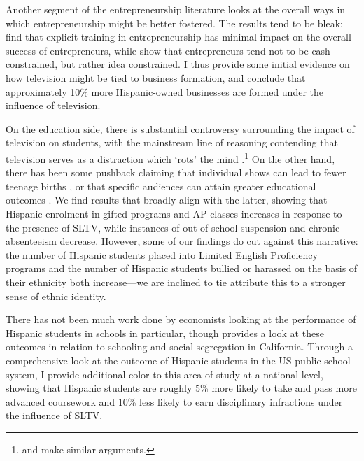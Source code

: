 \documentclass[11pt]{article}
\begin{document}
Another segment of the entrepreneurship literature looks at the overall ways in which entrepreneurship might be better fostered. The results tend to be bleak: \cite{karlan_teaching_2011} find that explicit training in entrepreneurship has minimal impact on the overall success of entrepreneurs, while \cite{gine_money_2014} show that entrepreneurs tend not to be cash constrained, but rather idea constrained. I thus provide some initial evidence on how television might be tied to business formation, and conclude that approximately 10\% more Hispanic-owned businesses are formed under the influence of television. 


On the education side, there is substantial controversy surrounding the impact of television on students, with the mainstream line of reasoning contending that television serves as a distraction which `rots' the mind \citep{zavodny_does_2006}.\footnote{ \cite{winn_plug-drug_2002} and \cite{gentile_well-child_2004} make similar arguments.} On the other hand, there has been some pushback claiming that individual shows can lead to fewer teenage births \citep{kearney_media_2015}, or that specific audiences can attain greater educational outcomes \citep{gentzkow_preschool_2008}. We find results that broadly align with the latter, showing that Hispanic enrolment in gifted programs and AP classes increases in response to the presence of SLTV, while instances of out of school suspension and chronic absenteeism decrease. However, some of our findings do cut against this narrative: the number of Hispanic students placed into Limited English Proficiency programs and the number of Hispanic students bullied or harassed on the basis of their ethnicity both increase---we are inclined to tie attribute this to a stronger sense of ethnic identity.

There has not been much work done by economists looking at the performance of Hispanic students in schools in particular, though \cite{cascio_cracks_2012} provides a look at these outcomes in relation to schooling and social segregation in California. Through a comprehensive look at the outcome of Hispanic students in the US public school system, I provide additional color to this area of study at a national level, showing that Hispanic students are roughly 5\% more likely to take and pass more advanced coursework and 10\% less likely to earn disciplinary infractions under the influence of SLTV.
\end{document}
